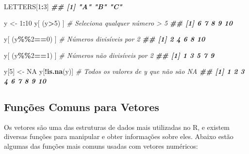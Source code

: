 \documentclass[
]{book}
\newenvironment{Shaded}{\begin{snugshade}}{\end{snugshade}}
\newcommand{\CommentTok}[1]{\textcolor[rgb]{0.56,0.35,0.01}{\textit{#1}}}
\newcommand{\ConstantTok}[1]{\textcolor[rgb]{0.56,0.35,0.01}{#1}}
\newcommand{\DecValTok}[1]{\textcolor[rgb]{0.00,0.00,0.81}{#1}}
\newcommand{\DocumentationTok}[1]{\textcolor[rgb]{0.56,0.35,0.01}{\textbf{\textit{#1}}}}
\newcommand{\FunctionTok}[1]{\textcolor[rgb]{0.13,0.29,0.53}{\textbf{#1}}}
\newcommand{\NormalTok}[1]{#1}
\newcommand{\OtherTok}[1]{\textcolor[rgb]{0.56,0.35,0.01}{#1}}
\newcommand{\SpecialCharTok}[1]{\textcolor[rgb]{0.81,0.36,0.00}{\textbf{#1}}}
\begin{document}
\begin{Shaded}
\begin{Highlighting}[]
\NormalTok{LETTERS[}\DecValTok{1}\SpecialCharTok{:}\DecValTok{3}\NormalTok{]}
\DocumentationTok{\#\# [1] "A" "B" "C"}

\NormalTok{y }\OtherTok{\textless{}{-}} \DecValTok{1}\SpecialCharTok{:}\DecValTok{10}
\NormalTok{y[ (y}\SpecialCharTok{\textgreater{}}\DecValTok{5}\NormalTok{) ] }\CommentTok{\# Seleciona qualquer número \textgreater{} 5}
\DocumentationTok{\#\# [1]  6  7  8  9 10}

\NormalTok{y[ (y}\SpecialCharTok{\%\%}\DecValTok{2}\SpecialCharTok{==}\DecValTok{0}\NormalTok{) ] }\CommentTok{\# Números divisíveis por 2}
\DocumentationTok{\#\# [1]  2  4  6  8 10}

\NormalTok{y[ (y}\SpecialCharTok{\%\%}\DecValTok{2}\SpecialCharTok{==}\DecValTok{1}\NormalTok{) ] }\CommentTok{\# Números não divisíveis por 2}
\DocumentationTok{\#\# [1] 1 3 5 7 9}

\NormalTok{y[}\DecValTok{5}\NormalTok{] }\OtherTok{\textless{}{-}} \ConstantTok{NA}
\NormalTok{y[}\SpecialCharTok{!}\FunctionTok{is.na}\NormalTok{(y)] }\CommentTok{\# Todos os valores de y que não são NA}
\DocumentationTok{\#\# [1]  1  2  3  4  6  7  8  9 10}
\end{Highlighting}
\end{Shaded}

\subsection{Funções Comuns para Vetores}\label{funuxe7uxf5es-comuns-para-vetores}

Os vetores são uma das estruturas de dados mais utilizadas no R, e
existem diversas funções para manipular e obter informações sobre eles.
Abaixo estão algumas das funções mais comuns usadas com vetores
numéricos:
\end{document}

